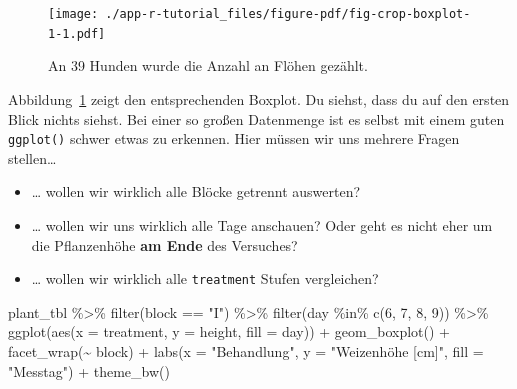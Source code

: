 \documentclass[
  letterpaper,
]{scrbook}
\newenvironment{Shaded}{\begin{snugshade}}{\end{snugshade}}
\newcommand{\AttributeTok}[1]{\textcolor[rgb]{0.40,0.45,0.13}{#1}}
\newcommand{\DecValTok}[1]{\textcolor[rgb]{0.68,0.00,0.00}{#1}}
\newcommand{\FunctionTok}[1]{\textcolor[rgb]{0.28,0.35,0.67}{#1}}
\newcommand{\NormalTok}[1]{\textcolor[rgb]{0.00,0.23,0.31}{#1}}
\newcommand{\SpecialCharTok}[1]{\textcolor[rgb]{0.37,0.37,0.37}{#1}}
\newcommand{\StringTok}[1]{\textcolor[rgb]{0.13,0.47,0.30}{#1}}
\providecommand{\tightlist}{%
  \setlength{\itemsep}{0pt}\setlength{\parskip}{0pt}}\usepackage{longtable,booktabs,array}
\begin{document}
\begin{figure}[H]

{\centering \texttt{[image: ./app-r-tutorial\_files/figure-pdf/fig-crop-boxplot-1-1.pdf]}

}

\caption{\label{fig-crop-boxplot-1}An 39 Hunden wurde die Anzahl an
Flöhen gezählt.}

\end{figure}

Abbildung~\ref{fig-crop-boxplot-1} zeigt den entsprechenden Boxplot. Du
siehst, dass du auf den ersten Blick nichts siehst. Bei einer so großen
Datenmenge ist es selbst mit einem guten \texttt{ggplot()} schwer etwas
zu erkennen. Hier müssen wir uns mehrere Fragen stellen\ldots{}

\begin{itemize}
\tightlist
\item
  \ldots{} wollen wir wirklich alle Blöcke getrennt auswerten?
\item
  \ldots{} wollen wir uns wirklich alle Tage anschauen? Oder geht es
  nicht eher um die Pflanzenhöhe \textbf{am Ende} des Versuches?
\item
  \ldots{} wollen wir wirklich alle \texttt{treatment} Stufen
  vergleichen?
\end{itemize}

\begin{Shaded}
\begin{Highlighting}[]
\NormalTok{plant\_tbl }\SpecialCharTok{\%\textgreater{}\%} 
  \FunctionTok{filter}\NormalTok{(block }\SpecialCharTok{==} \StringTok{"I"}\NormalTok{) }\SpecialCharTok{\%\textgreater{}\%} 
  \FunctionTok{filter}\NormalTok{(day }\SpecialCharTok{\%in\%} \FunctionTok{c}\NormalTok{(}\DecValTok{6}\NormalTok{, }\DecValTok{7}\NormalTok{, }\DecValTok{8}\NormalTok{, }\DecValTok{9}\NormalTok{)) }\SpecialCharTok{\%\textgreater{}\%} 
  \FunctionTok{ggplot}\NormalTok{(}\FunctionTok{aes}\NormalTok{(}\AttributeTok{x =}\NormalTok{ treatment, }\AttributeTok{y =}\NormalTok{ height, }\AttributeTok{fill =}\NormalTok{ day)) }\SpecialCharTok{+}
  \FunctionTok{geom\_boxplot}\NormalTok{() }\SpecialCharTok{+}
  \FunctionTok{facet\_wrap}\NormalTok{(}\SpecialCharTok{\textasciitilde{}}\NormalTok{ block) }\SpecialCharTok{+}
  \FunctionTok{labs}\NormalTok{(}\AttributeTok{x =} \StringTok{"Behandlung"}\NormalTok{, }\AttributeTok{y =} \StringTok{"Weizenhöhe [cm]"}\NormalTok{, }\AttributeTok{fill =} \StringTok{"Messtag"}\NormalTok{) }\SpecialCharTok{+}
  \FunctionTok{theme\_bw}\NormalTok{()}
\end{Highlighting}
\end{Shaded}
\end{document}
